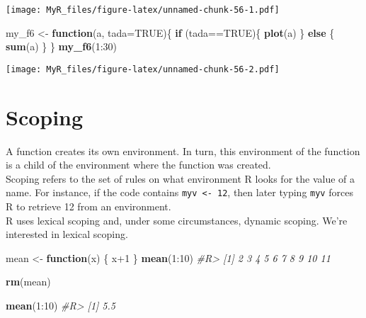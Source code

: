 \documentclass[]{book}
\newenvironment{Shaded}{}{}
\newcommand{\CommentTok}[1]{\textcolor[rgb]{0.38,0.63,0.69}{\textit{#1}}}
\newcommand{\ControlFlowTok}[1]{\textcolor[rgb]{0.00,0.44,0.13}{\textbf{#1}}}
\newcommand{\DataTypeTok}[1]{\textcolor[rgb]{0.56,0.13,0.00}{#1}}
\newcommand{\DecValTok}[1]{\textcolor[rgb]{0.25,0.63,0.44}{#1}}
\newcommand{\KeywordTok}[1]{\textcolor[rgb]{0.00,0.44,0.13}{\textbf{#1}}}
\newcommand{\NormalTok}[1]{#1}
\newcommand{\OperatorTok}[1]{\textcolor[rgb]{0.40,0.40,0.40}{#1}}
\newcommand{\OtherTok}[1]{\textcolor[rgb]{0.00,0.44,0.13}{#1}}
\newcommand{\StringTok}[1]{\textcolor[rgb]{0.25,0.44,0.63}{#1}}
\theoremstyle{definition}
\theoremstyle{definition}
\theoremstyle{definition}
\theoremstyle{remark}
\begin{document}
\texttt{[image: MyR\_files/figure-latex/unnamed-chunk-56-1.pdf]}

\begin{Shaded}
\begin{Highlighting}[]

\NormalTok{my_f6 <-}\StringTok{ }\ControlFlowTok{function}\NormalTok{(a, }\DataTypeTok{tada=}\OtherTok{TRUE}\NormalTok{)\{}
  \ControlFlowTok{if}\NormalTok{ (tada}\OperatorTok{==}\OtherTok{TRUE}\NormalTok{)\{}
    \KeywordTok{plot}\NormalTok{(a)}
\NormalTok{  \} }\ControlFlowTok{else}\NormalTok{ \{}
    \KeywordTok{sum}\NormalTok{(a)}
\NormalTok{  \}}
\NormalTok{\}}
\KeywordTok{my_f6}\NormalTok{(}\DecValTok{1}\OperatorTok{:}\DecValTok{30}\NormalTok{)}
\end{Highlighting}
\end{Shaded}

\texttt{[image: MyR\_files/figure-latex/unnamed-chunk-56-2.pdf]}

\hypertarget{scoping}{%
\section{Scoping}\label{scoping}}

A function creates its own environment. In turn, this environment of the
function is a child of the environment where the function was created.\\
Scoping refers to the set of rules on what environment R looks for the
value of a name. For instance, if the code contains
\texttt{myv\ \textless{}-\ 12}, then later typing \texttt{myv} forces R
to retrieve 12 from an environment.\\
R uses lexical scoping and, under some circumstances, dynamic scoping.
We're interested in lexical scoping.

\begin{Shaded}
\begin{Highlighting}[]
\NormalTok{mean <-}\StringTok{ }\ControlFlowTok{function}\NormalTok{(x) \{}
\NormalTok{  x}\OperatorTok{+}\DecValTok{1}
\NormalTok{\}}
\KeywordTok{mean}\NormalTok{(}\DecValTok{1}\OperatorTok{:}\DecValTok{10}\NormalTok{)}
\CommentTok{#R>  [1]  2  3  4  5  6  7  8  9 10 11}

\KeywordTok{rm}\NormalTok{(mean)}

\KeywordTok{mean}\NormalTok{(}\DecValTok{1}\OperatorTok{:}\DecValTok{10}\NormalTok{)}
\CommentTok{#R> [1] 5.5}
\end{Highlighting}
\end{Shaded}
\end{document}
